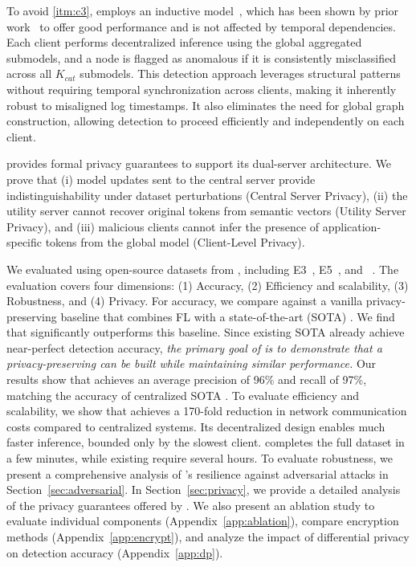   To avoid \ref{itm:c3}, \Sys employs an inductive \gnnshort model~\cite{hamilton2017inductive}, which has been shown by prior work~\cite{flash2024,shadewatcher,wang2022threatrace} to offer good performance and is not affected by temporal dependencies. Each client performs decentralized inference using the global aggregated submodels, and a node is flagged as anomalous if it is consistently misclassified across all \( K_{cat} \) submodels. This detection approach leverages structural patterns without requiring temporal synchronization across clients, making it inherently robust to misaligned log timestamps. It also eliminates the need for global graph construction, allowing detection to proceed efficiently and independently on each client.


 \Sys provides formal privacy guarantees to support its dual-server architecture. We prove that (i) model updates sent to the central server provide indistinguishability under dataset perturbations (Central Server Privacy), (ii) the utility server cannot recover original tokens from semantic vectors (Utility Server Privacy), and (iii) malicious clients cannot infer the presence of application-specific tokens from the global model (Client-Level Privacy).



We evaluated \Sys using open-source datasets from \darpa, including E3~\cite{error3}, E5~\cite{bug5}, and \optc~\cite{anjum2021analyzing}. The evaluation covers four dimensions: (1) Accuracy, (2) Efficiency and scalability, (3) Robustness, and (4) Privacy. For accuracy, we compare \Sys against a vanilla privacy-preserving \pids baseline that combines FL with a state-of-the-art (SOTA) \pids. We find that \Sys significantly outperforms this baseline. Since existing SOTA \pids already achieve near-perfect detection accuracy, {\it the primary goal of \Sys is to demonstrate that a privacy-preserving \pids can be built while maintaining similar performance.} Our results show that \Sys achieves an average precision of 96\% and recall of 97\%, matching the accuracy of centralized SOTA \pids. To evaluate efficiency and scalability, we show that \Sys achieves a 170-fold reduction in network communication costs compared to centralized systems. Its decentralized design enables much faster inference, bounded only by the slowest client. \Sys completes the full \optc dataset in a few minutes, while existing \pids require several hours. To evaluate robustness, we present a comprehensive analysis of \Sys’s resilience against adversarial attacks in Section~\ref{sec:adversarial}. In Section~\ref{sec:privacy}, we provide a detailed analysis of the privacy guarantees offered by \Sys. We also present an ablation study to evaluate individual components (Appendix~\ref{app:ablation}), compare encryption methods (Appendix~\ref{app:encrypt}), and analyze the impact of differential privacy on detection accuracy (Appendix~\ref{app:dp}).


